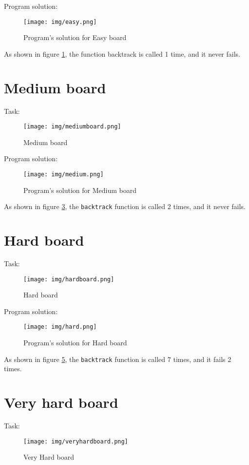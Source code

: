 \documentclass{article}
\begin{document}
Program solution:
\begin{figure}[H]
\centering
\texttt{[image: img/easy.png]}
\caption{\label{fig:easy}Program's solution for Easy board}
\end{figure}

As shown in figure \ref{fig:easy}, the function backtrack is called 1 time, and it never fails.

\newpage
\section{Medium board}\label{sect3}
Task:
\begin{figure}[H]
\centering
\texttt{[image: img/mediumboard.png]}
\caption{Medium board}
\label{fig:mediumboard}
\end{figure}

Program solution:
\begin{figure}[H]
\centering
\texttt{[image: img/medium.png]}
\caption{\label{fig:medium}Program's solution for Medium board}
\end{figure}
As shown in figure \ref{fig:medium}, the \texttt{backtrack} function is called 2 times, and it never fails.

\newpage
\section{Hard board}\label{sect4}
Task:
\begin{figure}[H]
\centering
\texttt{[image: img/hardboard.png]}
\caption{Hard board}
\label{fig:hardboard}
\end{figure}

Program solution:
\begin{figure}[H]
\centering
\texttt{[image: img/hard.png]}
\caption{\label{fig:hard}Program's solution for Hard board}
\end{figure}
As shown in figure \ref{fig:hard}, the \texttt{backtrack} function is called 7 times, and it fails 2 times.

\newpage
\section{Very hard board}\label{sect5}
Task:
\begin{figure}[H]
\centering
\texttt{[image: img/veryhardboard.png]}
\caption{Very Hard board}
\label{fig:veryhardboard}
\end{figure}
\end{document}
